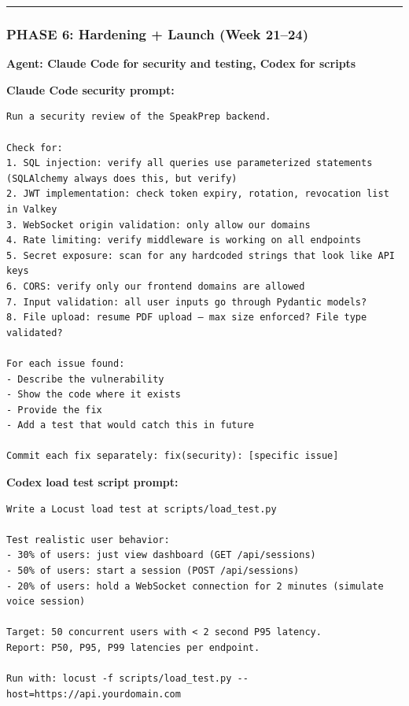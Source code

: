 \documentclass[
  11pt,
]{article}
\begin{document}
\begin{center}\rule{0.5\linewidth}{0.5pt}\end{center}

\hypertarget{phase-6-hardening-launch-week-2124}{%
\subsubsection{PHASE 6: Hardening + Launch (Week
21--24)}\label{phase-6-hardening-launch-week-2124}}

\textbf{Agent: Claude Code for security and testing, Codex for scripts}

\textbf{Claude Code security prompt:}

\begin{lstlisting}
Run a security review of the SpeakPrep backend.

Check for:
1. SQL injection: verify all queries use parameterized statements (SQLAlchemy always does this, but verify)
2. JWT implementation: check token expiry, rotation, revocation list in Valkey
3. WebSocket origin validation: only allow our domains
4. Rate limiting: verify middleware is working on all endpoints
5. Secret exposure: scan for any hardcoded strings that look like API keys
6. CORS: verify only our frontend domains are allowed
7. Input validation: all user inputs go through Pydantic models?
8. File upload: resume PDF upload — max size enforced? File type validated?

For each issue found:
- Describe the vulnerability
- Show the code where it exists
- Provide the fix
- Add a test that would catch this in future

Commit each fix separately: fix(security): [specific issue]
\end{lstlisting}

\textbf{Codex load test script prompt:}

\begin{lstlisting}
Write a Locust load test at scripts/load_test.py

Test realistic user behavior:
- 30% of users: just view dashboard (GET /api/sessions)
- 50% of users: start a session (POST /api/sessions)
- 20% of users: hold a WebSocket connection for 2 minutes (simulate voice session)

Target: 50 concurrent users with < 2 second P95 latency.
Report: P50, P95, P99 latencies per endpoint.

Run with: locust -f scripts/load_test.py --host=https://api.yourdomain.com
\end{lstlisting}
\end{document}
